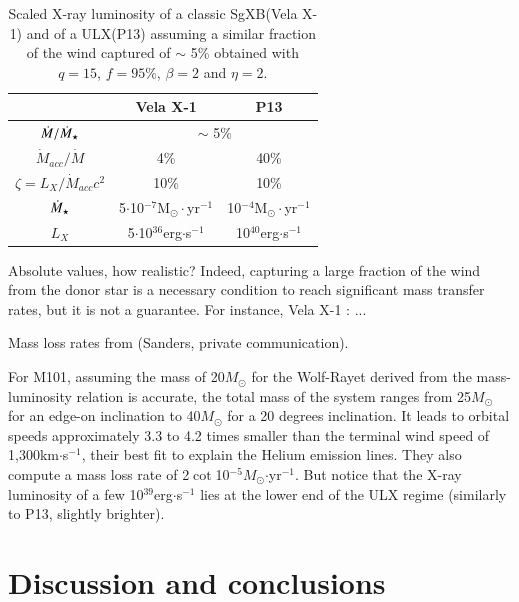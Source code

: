 \documentclass[letter]{aa}
\makeatletter
\newcommand{\sgx}{SgXB\xspace}
\newcommand{\ulx}{ULX\xspace}
\newcommand{\mystar}{{\fontfamily{lmr}\selectfont$\star$}}
\newcommand*{\msun}{$M_{\odot}$\@\xspace}
\newcommand*{\mdotstar}{$\dot{M}_{\text{\mystar}}$\@\xspace}
\makeatother
\begin{document}
\begin{center}
\begin{table}[!h]
\caption{Scaled X-ray luminosity of a classic \sgx (Vela X-1) and of a \ulx (P13) assuming a similar fraction of the wind captured of $\sim$ 5\% obtained with $q=15$, $f=95\%$, $\beta=2$ and $\eta=2$.}
\label{tab:params}
\centering
\begin{tabularx}{0.83\columnwidth}{c|c|c}
   & Vela X-1 & P13 \\
  \hline
  $\dot{M}/\dot{M}_{\text{\mystar}}$ & \multicolumn{2}{c}{$\sim$ 5\%} \\
  \hline
  $\dot{M}_{acc}/\dot{M}$ & 4\%  & 40\% \\
  $\zeta=L_X/\dot{M}_{acc}c^2$ & 10\% & 10\% \\
  \mdotstar & 5$\cdot$10$^{-7}$M$_{\odot}\cdot$yr$^{-1}$ & 10$^{-4}$M$_{\odot}\cdot$yr$^{-1}$ \\
  $L_X$ & 5$\cdot$10$^{36}$erg$\cdot$s$^{-1}$ & 10$^{40}$erg$\cdot$s$^{-1}$ \\
\end{tabularx}
\end{table}
\end{center}

Absolute values, how realistic? Indeed, capturing a large fraction of the wind from the donor star is a necessary condition to reach significant mass transfer rates, but it is not a guarantee. For instance, Vela X-1 : ...

Mass loss rates from \cite{Vink2000,Vink2001} (Sanders, private communication).

For M101, assuming the mass of 20\msun for the Wolf-Rayet derived from the mass-luminosity relation is accurate, the total mass of the system ranges from 25\msun for an edge-on inclination to 40\msun for a 20 degrees inclination. It leads to orbital speeds approximately 3.3 to 4.2 times smaller than the terminal wind speed of 1,300km$\cdot$s$^{-1}$, their best fit to explain the Helium emission lines. They also compute a mass loss rate of 2$\cot$10$^{-5}$\msun$\cdot$yr$^{-1}$. But notice that the X-ray luminosity of a few 10$^{39}$erg$\cdot$s$^{-1}$ lies at the lower end of the ULX regime (similarly to P13, slightly brighter).

\section{Discussion and conclusions}
\label{sec:}
\end{document}
